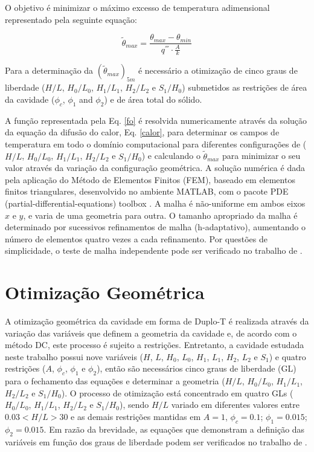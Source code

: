 \documentclass[12pt,A4,A4pt]{article}
\begin{document}
O objetivo é minimizar o máximo excesso de temperatura adimensional representado pela seguinte equação:

\begin{equation}
\tilde{\theta}_{max}=\frac{\theta_{max}-\theta_{min}}{q^{'''}\cdot\frac{A}{k}}\label{fo}
\end{equation}

Para a determinação da $(\tilde{\theta}_{max})_{5m}$ é necessário a otimização de cinco graus de liberdade ($H/L$, $H_{0}/L_{0}$, $H_{1}/L_{1}$, $H_{2}/L_{2}$ e $S_{1}/H_{0}$) submetidos as restrições de área da cavidade ($\phi_{c}$, $\phi_{1}$ and $\phi_{2}$) e de área total do sólido.

A função representada pela Eq. \ref{fo} é resolvida numericamente através da  solução da equação da difusão do calor, Eq. \ref{calor}, para determinar os campos de temperatura em todo o domínio computacional para diferentes configurações de ($H/L$, $H_{0}/L_{0}$, $H_{1}/L_{1}$, $H_{2}/L_{2}$ e $S_{1}/H_{0}$) e calculando o $\tilde{\theta}_{max}$ para minimizar o seu valor através da variação da configuração geométrica. A solução numérica é dada pela aplicação do Método de Elementos Finitos (FEM), baseado em elementos finitos triangulares, desenvolvido no ambiente MATLAB, com o pacote PDE (partial-differential-equations) toolbox \citep{Reddy1994}. A malha é não-uniforme em ambos eixos $x$ e $y$, e varia de uma geometria para outra. O tamanho apropriado da malha é determinado por sucessivos refinamentos de malha (h-adaptativo), aumentando o número de elementos quatro vezes a cada refinamento. Por questões de simplicidade, o teste de malha independente pode ser verificado no trabalho de \cite{Gonzales2015cilamce}.

\section{Otimização Geométrica}
\label{opt}
\hspace{0.5cm}A otimização geométrica da cavidade em forma de Duplo-T é realizada através da variação das variáveis que definem a geometria da cavidade e, de acordo com o método DC, este processo é sujeito a restrições. Entretanto, a cavidade estudada neste trabalho possui nove variáveis ($H$, $L$, $H_{0}$, $L_{0}$, $H_{1}$, $L_{1}$, $H_{2}$, $L_{2}$ e $S_{1}$) e quatro restrições ($A$, $\phi_{c}$, $\phi_{1}$ e $\phi_{2}$), então são necessários cinco graus de liberdade (GL) para o fechamento das equações e determinar a geometria ($H/L$, $H_{0}/L_{0}$, $H_{1}/L_{1}$, $H_{2}/L_{2}$ e $S_{1}/H_{0}$). O processo de otimização está concentrado em quatro GLs ( $H_{0}/L_{0}$, $H_{1}/L_{1}$, $H_{2}/L_{2}$ e $S_{1}/H_{0}$), sendo $H/L$ variado em diferentes valores entre $0.03< H/L >30$ e as demais restrições mantidas em $A = 1$, $\phi_{c}=0.1$; $\phi_{1} =0.015$; $\phi_{2}=0.015$. Em razão da brevidade, as equações que demonstram a definição das variáveis em função dos graus de liberdade podem ser verificados no trabalho de \cite{Gonzales2015cilamce}.
\end{document}

